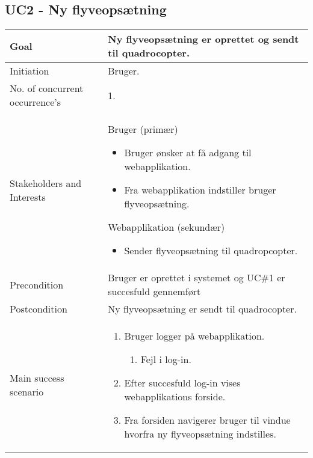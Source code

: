 \subsection*{UC2 - Ny flyveopsætning}

\begin{table}[H]
\begin{tabular}{|l|p{10cm}|}
\hline

Goal	 							& Ny flyveopsætning er oprettet og sendt til quadrocopter. \\\hline
Initiation 							& Bruger. \\\hline
No. of concurrent occurrence’s		& 1. \\\hline
Stakeholders	and Interests			& Bruger (primær) 
										\begin{itemize}
											\item Bruger ønsker at få adgang til webapplikation.
											\item Fra webapplikation indstiller bruger flyveopsætning.
										\end{itemize}
									  Webapplikation (sekundær)
										\begin{itemize}
											\item Sender flyveopsætning til quadropcopter.
										\end{itemize} \\\hline
Precondition							& Bruger er oprettet i systemet og UC\#1 er succesfuld gennemført  \\\hline
Postcondition						& Ny flyveopsætning er sendt til quadrocopter. \\\hline
Main success scenario				&
 
									\renewcommand{\labelenumi}{\arabic{enumi}.}
									\renewcommand{\labelenumii}{\Roman{enumii}:}

									\begin{enumerate}[topsep=0.0cm, leftmargin=0.5cm]
										\item Bruger logger på webapplikation.
										\begin{enumerate}[partopsep=4cm, topsep=0cm, leftmargin=1cm]
												\item Fejl i log-in.
										\end{enumerate}
										\item Efter succesfuld log-in vises webapplikations forside.
										\item Fra forsiden navigerer bruger til vindue hvorfra ny flyveopsætning indstilles.
									\end{enumerate} \\\hline	


\end{tabular}
\end{table}
